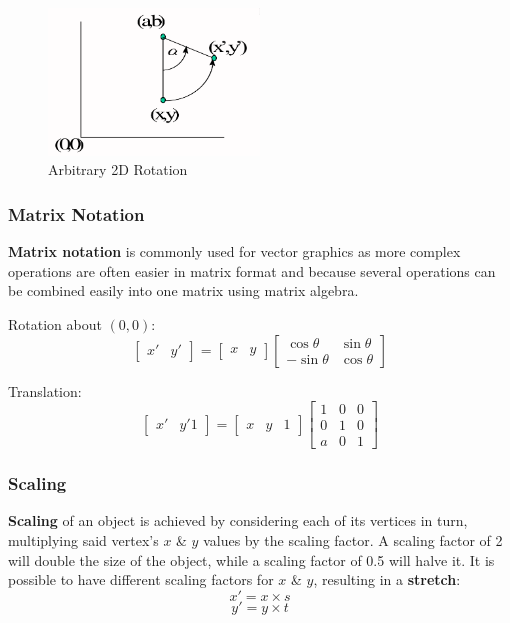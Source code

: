 \documentclass[a4paper,11pt]{article}
\begin{document}
\begin{figure}[H]
    \centering
    \includegraphics[width=0.5\textwidth]{images/2d_arbitrary_rotation.png}
    \caption{Arbitrary 2D Rotation}
\end{figure}

\subsubsection{Matrix Notation}
\textbf{Matrix notation} is commonly used for vector graphics as more complex operations are often easier in matrix format 
and because several operations can be combined easily into one matrix using matrix algebra.

Rotation about $(0,0)$:
$$
\begin{bmatrix}
    x' & y'
\end{bmatrix}
=
\begin{bmatrix}
    x & y
\end{bmatrix}
\begin{bmatrix}
 \cos \theta & \sin \theta \\
-\sin \theta & \cos \theta
\end{bmatrix}
$$

Translation:
$$
\begin{bmatrix}
    x' & y' 1
\end{bmatrix}
=
\begin{bmatrix}
    x & y & 1
\end{bmatrix}
\begin{bmatrix}
    1 & 0 & 0 \\
    0 & 1 & 0 \\
    a & 0 & 1
\end{bmatrix}
$$

\subsubsection{Scaling}
\textbf{Scaling} of an object is achieved by considering each of its vertices in turn, multiplying said vertex's $x$ \& $y$
values by the scaling factor.
A scaling factor of 2 will double the size of the object, while a scaling factor of 0.5 will halve it.
It is possible to have different scaling factors for $x$ \& $y$, resulting in a \textbf{stretch}:
$$
x' = x \times s
$$
$$
y' = y \times t
$$
\end{document}

